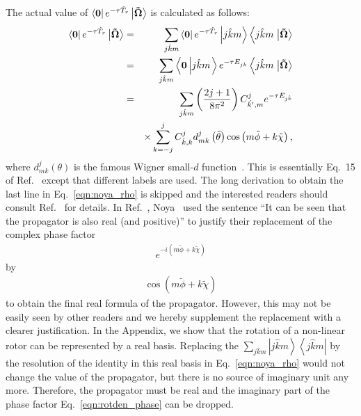 \documentclass[12pt]{iopart}
\begin{document}
The actual value of
$\left<{\bf 0}\right| e^{ -\tau\hat{T}_r }\left| {\bf \tilde{\Omega}} \right>$
is calculated as follows:
\begin{eqnarray}
\left<{\bf 0}\right| e^{ -\tau\hat{T}_r }\left| {\bf \tilde{\Omega}} \right>&=&\sum_{j\hat{k}m}\left<{\bf 0}\right| e^{ -\tau\hat{T}_r }\left|j\hat{k}m \right>\left<j\hat{k}m \right.\left| {\bf \tilde{\Omega}} \right>\nonumber\\
&=&\sum_{j\hat{k}m}\left<{\bf 0} \left| j\hat{k}m \right.\right> e^{ -\tau E_{j\hat{k}} }\left<j\hat{k}m \right.\left| {\bf \tilde{\Omega}} \right>\nonumber\\
&=&\sum_{j\hat{k}m}\left( \frac{2j+1}{8\pi^2} \right)C_{\hat{k'},m}^j e^{-\tau E_{j\hat{k}} }\nonumber\\
&&\times\sum_{k=-j}^j C_{\hat{k},k}^j d^{j}_{mk}\left( \tilde{\theta} \right)\cos\left( m\tilde{\phi}+k\tilde{\chi} \right), \label{eqn:noya_rho}
\end{eqnarray}
where $d_{mk}^j\left( {\theta} \right)$ is the famous Wigner small-$d$ function~\cite{zare_1988}. 
This is essentially Eq.~15 of Ref.~\cite{noya_rotden} except that different labels are used. The long derivation to obtain the last line in Eq.~\ref{eqn:noya_rho} is skipped and the interested readers should consult Ref.~\cite{noya_rotden} for details. 
In Ref.~\cite{noya_rotden}, Noya \etal~used the sentence 
``It can be seen that the propagator is also real (and positive)'' to justify their replacement of the complex phase factor 
\begin{eqnarray}
e^{-i\left(m\tilde{\phi}+k\tilde{\chi}  \right)} \label{eqn:rotden_phase}
\end{eqnarray}
by
\begin{eqnarray}
\cos\left( m\tilde{\phi}+k\tilde{\chi} \right)
\end{eqnarray}
to obtain the final real formula of the propagator. However, this may not be easily seen by other readers and we hereby supplement the replacement with a clearer justification. In the Appendix,
we show that the rotation of a non-linear rotor can be represented by a real basis. Replacing the $\sum_{j\hat{k}m}\left| j\hat{k}m \right>\left<j\hat{k}m \right|$ by the resolution of the identity in this real basis in Eq.~\ref{eqn:noya_rho} would not change the value of the propagator, but there is no source of imaginary unit any more. Therefore, the propagator must be real and the imaginary part of the phase factor Eq.~\ref{eqn:rotden_phase} can be dropped.
\end{document}
